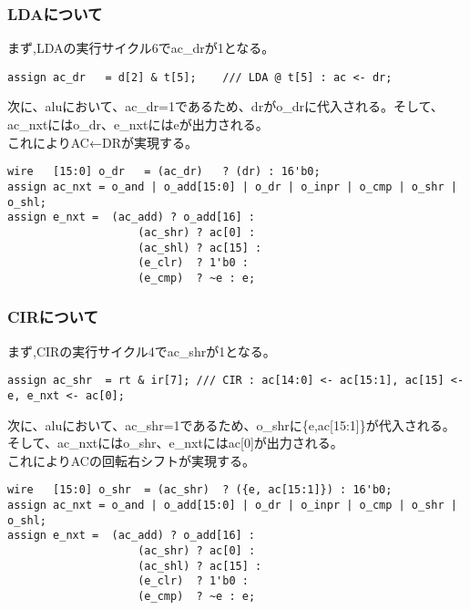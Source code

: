 \documentclass{jsarticle}
\begin{document}
\subsubsection*{LDAについて}
まず,LDAの実行サイクル6でac\_drが1となる。 \\
\begin{lstlisting}[caption=cpu\_ex3.v 167行目]
assign ac_dr   = d[2] & t[5];    /// LDA @ t[5] : ac <- dr;
\end{lstlisting}
次に、aluにおいて、ac\_dr=1であるため、drがo\_drに代入される。そして、ac\_nxtにはo\_dr、e\_nxtにはeが出力される。 \\
これによりAC←DRが実現する。
\begin{lstlisting}[caption=cpu\_module.v ALU modelより]
wire   [15:0] o_dr   = (ac_dr)   ? (dr) : 16'b0;
assign ac_nxt = o_and | o_add[15:0] | o_dr | o_inpr | o_cmp | o_shr | o_shl;
assign e_nxt =  (ac_add) ? o_add[16] :
                    (ac_shr) ? ac[0] :
                    (ac_shl) ? ac[15] :
                    (e_clr)  ? 1'b0 :
                    (e_cmp)  ? ~e : e;
\end{lstlisting}

\subsubsection*{CIRについて}
まず,CIRの実行サイクル4でac\_shrが1となる。 \\
\begin{lstlisting}[caption=cpu\_ex3.v 170行目]
assign ac_shr  = rt & ir[7]; /// CIR : ac[14:0] <- ac[15:1], ac[15] <- e, e_nxt <- ac[0];
\end{lstlisting}
次に、aluにおいて、ac\_shr=1であるため、o\_shrに\{e,ac[15:1]\}が代入される。そして、ac\_nxtにはo\_shr、e\_nxtにはac[0]が出力される。 \\
これによりACの回転右シフトが実現する。
\begin{lstlisting}[caption=cpu\_module.v ALU modelより]
wire   [15:0] o_shr  = (ac_shr)  ? ({e, ac[15:1]}) : 16'b0;
assign ac_nxt = o_and | o_add[15:0] | o_dr | o_inpr | o_cmp | o_shr | o_shl;
assign e_nxt =  (ac_add) ? o_add[16] :
                    (ac_shr) ? ac[0] :
                    (ac_shl) ? ac[15] :
                    (e_clr)  ? 1'b0 :
                    (e_cmp)  ? ~e : e;
\end{lstlisting}
\end{document}
